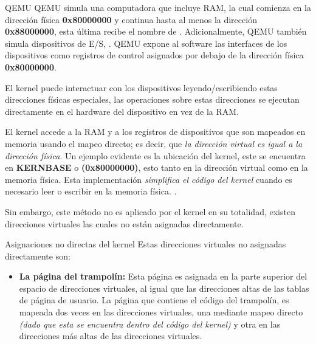 \documentclass{libs/ufc_format}
\begin{document}
\begin{frame}{QEMU}
  QEMU simula una computadora que incluye RAM, la cual comienza en la dirección física \textbf{0x80000000} y continua hasta al menos la dirección \textbf{0x88000000}, esta última recibe el nombre de . Adicionalmente, QEMU también simula dispositivos de E/S, . QEMU expone al software las interfaces de los dispositivos como registros de control asignados por debajo de la dirección física \textbf{0x80000000}.

  \vspace{0.3cm}

  El kernel puede interactuar con los dispositivos leyendo/escribiendo estas direcciones físicas especiales, las operaciones sobre estas direcciones se ejecutan directamente en el hardware del dispositivo en vez de la RAM. \cite{xv6_book}
\end{frame}
\begin{frame}{}
  El kernel accede a la RAM y a los registros de dispositivos que son mapeados en memoria usando el mapeo directo; es decir, que \emph{la dirección virtual es igual a la dirección física}. Un ejemplo evidente es la ubicación del kernel, este se encuentra en \textbf{KERNBASE} o \textbf{(0x80000000)}, esto tanto en la dirección virtual como en la memoria física. Esta implementación \emph{simplifica el código del kernel} cuando es necesario leer o escribir en la memoria física. \cite{xv6_book}.

  \vspace{0.3cm}

  Sin embargo, este método no es aplicado por el kernel en su totalidad, existen direcciones virtuales las cuales no están asignadas directamente.
\end{frame}
\begin{frame}{Asignaciones no directas del kernel}
  Estas direcciones virtuales no asignadas directamente son:
  \begin{itemize}
    \item \textbf{La página del trampolín:} Esta página es asignada en la parte superior del espacio de direcciones virtuales, al igual que las direcciones altas de las tablas de página de usuario. La página que contiene el código del trampolín, es mapeada dos veces en las direcciones virtuales, una mediante mapeo directo \emph{(dado que esta se encuentra dentro del código del kernel)} y otra en las direcciones más altas de las direcciones virtuales. \cite{xv6_book}
  \end{itemize}
\end{frame}
\end{document}
